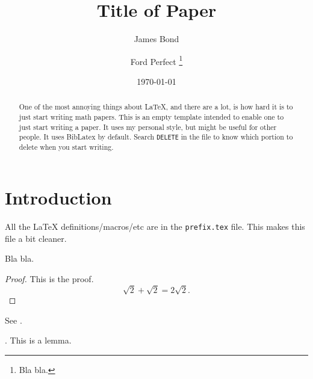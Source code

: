 \documentclass[12pt]{article}
\begin{document}
\title{Title of Paper}

\author{%
   James Bond%
   \and%
   Ford Perfect%
   \thanks{Bla bla.}%
}

\date{\today}

\maketitle

\begin{abstract}
    One of the most annoying things about \LaTeX, and there are a lot,
    is how hard it is to just start writing math papers. This is an
    empty template intended to enable one to just start writing a
    paper. It uses my personal style, but might be useful for other people. It uses BibLatex by default. Search \texttt{DELETE} in the file to know which portion to delete when you start writing.
\end{abstract}



\section{Introduction}




All the \LaTeX{} definitions/macros/etc are in the \texttt{prefix.tex} file. This makes this file a bit cleaner.


\begin{theorem}
    Bla bla.
\end{theorem}
\begin{proof}
    This is the proof.
    \[
    \sqrt{2} + \sqrt{2} = 2 \sqrt{2}.
    \]
\end{proof}


See .
\begin{lemma}
    .
    This is a lemma.
\end{lemma}
\end{document}

